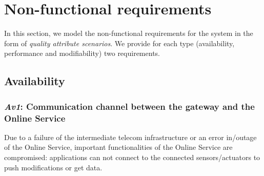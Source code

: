 \documentclass[english]{sareport}
\begin{document}
\chapter{Non-functional requirements}\label{sec:non-functional}
In this section, we model the non-functional requirements for the system in the
form of \emph{quality attribute scenarios}. We provide for each type
(availability, performance and modifiability) two requirements.

\section{Availability}
\subsection{\emph{Av1}: Communication channel between the gateway and the Online Service}
Due to a failure of the intermediate telecom infrastructure or an error in/outage of the Online Service, important functionalities of the Online Service are compromised: applications can not connect to the connected sensors/actuators to push modifications or get data.
\end{document}
